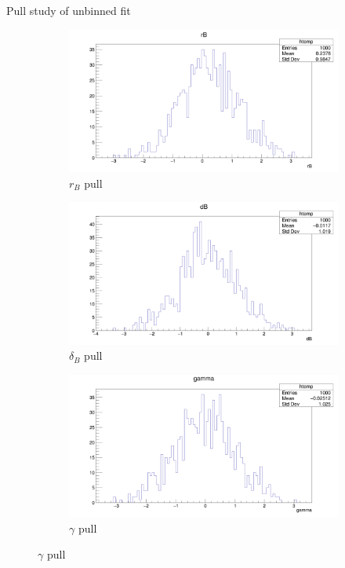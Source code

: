 \documentclass{beamer}
\begin{document}
\begin{frame}{Pull study of unbinned fit}
  \begin{figure}
    \centering
    \vspace{-0.2cm}
    \begin{subfigure}{0.5\textwidth}
      \includegraphics[width = 1.0\textwidth]{UnbinnedPulls/rB1K1K.png}
      \caption{$r_B$ pull}
    \end{subfigure}%
    \begin{subfigure}{0.5\textwidth}
      \includegraphics[width = 1.0\textwidth]{UnbinnedPulls/dB1K1K.png}
      \caption{$\delta_B$ pull}
    \end{subfigure}
    \begin{subfigure}{0.5\textwidth}
      \includegraphics[width = 1.0\textwidth]{UnbinnedPulls/gamma1K1K.png}
      \caption{$\gamma$ pull}
    \end{subfigure}
  \end{figure}
\end{frame}
\end{document}

